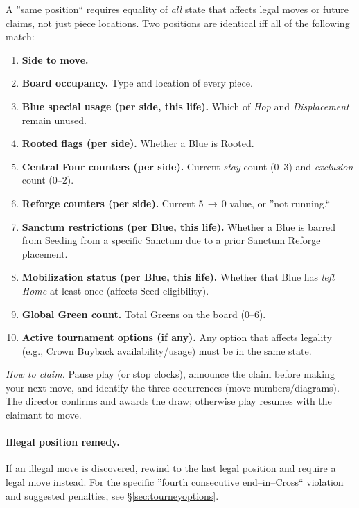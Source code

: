 \documentclass[11pt]{article}
\begin{document}
\begin{tcolorbox}[enhanced,breakable,title={Threefold Repetition --- Position Equivalence},colback=white,colframe=royal,boxrule=0.8pt]
\small
A ''same position`` requires equality of \emph{all} state that affects legal moves or future claims, not just piece locations. Two positions are identical iff all of the following match:
\begin{enumerate}[leftmargin=1.5em,itemsep=0.2em]
  \item \textbf{Side to move.}
  \item \textbf{Board occupancy.} Type and location of every piece.
  \item \textbf{Blue special usage (per side, this life).} Which of \emph{Hop} and \emph{Displacement} remain unused.
  \item \textbf{Rooted flags (per side).} Whether a Blue is Rooted.
  \item \textbf{Central Four counters (per side).} Current \emph{stay} count (0--3) and \emph{exclusion} count (0--2).
  \item \textbf{Reforge counters (per side).} Current 5\,$\to$\,0 value, or ''not running.``
  \item \textbf{Sanctum restrictions (per Blue, this life).} Whether a Blue is barred from Seeding from a specific Sanctum due to a prior Sanctum Reforge placement.
  \item \textbf{Mobilization status (per Blue, this life).} Whether that Blue has \emph{left Home} at least once (affects Seed eligibility).
  \item \textbf{Global Green count.} Total Greens on the board (0--6).
  \item \textbf{Active tournament options (if any).} Any option that affects legality (e.g., Crown Buyback availability/usage) must be in the same state.
\end{enumerate}
\textit{How to claim.} Pause play (or stop clocks), announce the claim before making your next move, and identify the three occurrences (move numbers/diagrams). The director confirms and awards the draw; otherwise play resumes with the claimant to move.
\end{tcolorbox}

\paragraph{Illegal position remedy.}
If an illegal move is discovered, rewind to the last legal position and require a legal move instead. For the specific ''fourth consecutive end--in--Cross`` violation and suggested penalties, see §\ref{sec:tourneyoptions}.
\end{document}
